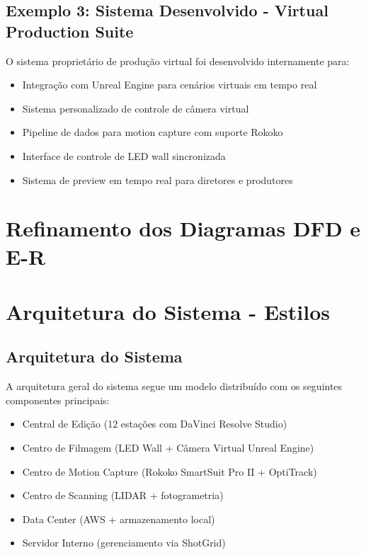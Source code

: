 \subsection{Exemplo 3: Sistema Desenvolvido - Virtual Production Suite}
O sistema proprietário de produção virtual foi desenvolvido internamente para:
\begin{itemize}
    \item Integração com Unreal Engine para cenários virtuais em tempo real
    \item Sistema personalizado de controle de câmera virtual
    \item Pipeline de dados para motion capture com suporte Rokoko
    \item Interface de controle de LED wall sincronizada
    \item Sistema de preview em tempo real para diretores e produtores
\end{itemize}
       

\section{Refinamento dos Diagramas DFD e E-R}

\section{Arquitetura do Sistema - Estilos}

\subsection{Arquitetura do Sistema}
A arquitetura geral do sistema segue um modelo distribuído com os seguintes componentes principais:
\begin{itemize}
    \item Central de Edição (12 estações com DaVinci Resolve Studio)
    \item Centro de Filmagem (LED Wall + Câmera Virtual Unreal Engine)
    \item Centro de Motion Capture (Rokoko SmartSuit Pro II + OptiTrack)
    \item Centro de Scanning (LIDAR + fotogrametria)
    \item Data Center (AWS + armazenamento local)
    \item Servidor Interno (gerenciamento via ShotGrid)
\end{itemize}

